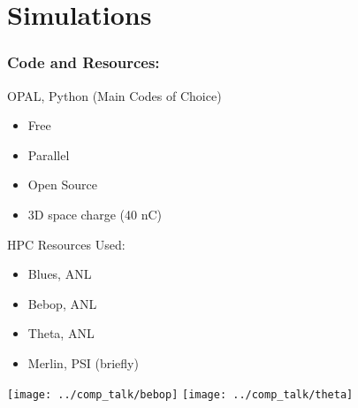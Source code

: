 \documentclass[professionalfonts,t]{beamer}
\newcommand{\secimage}{../../tex/images/awa_gun}
\begin{document}
{
	\renewcommand{\secimage}{../../tex/images/YAG1_40nC}
\section{Simulations}
\begin{frame}
\frametitle{Code and Resources: }
OPAL, Python (Main Codes of Choice)
\begin{minipage}{0.5\textwidth}
	\begin{itemize}
		\item Free
		\item Parallel 
		\item Open Source
		\item 3D space charge (40 nC)
	\end{itemize}	
\end{minipage}
\begin{minipage}{0.4\textwidth}
	\vspace{0.5em}
	HPC Resources Used:
	\begin{itemize}
		\item Blues, ANL
		\item Bebop, ANL
		\item Theta, ANL
		\item Merlin, PSI (briefly)
	\end{itemize}
\end{minipage}
\begin{center}
\vspace{0.5em}
\texttt{[image: ../comp\_talk/bebop]} \hspace{1em} \texttt{[image: ../comp\_talk/theta]}
\end{center}
\end{frame}

}
\end{document}
